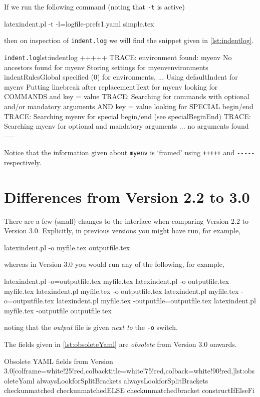 	 If we run the following command (noting that \texttt{-t} is active) \begin{commandshell}
latexindent.pl -t -l=logfile-prefs1.yaml simple.tex 
 \end{commandshell} then on inspection of \texttt{indent.log} we will find the snippet given in \cref{lst:indentlog}.
	 \begin{cmhlistings}[style=tcblatex,morekeywords={TRACE}]{\texttt{indent.log}}{lst:indentlog}
       +++++
TRACE: environment found: myenv
       No ancestors found for myenv
       Storing settings for myenvenvironments
       indentRulesGlobal specified (0) for environments, ...
       Using defaultIndent for myenv
       Putting linebreak after replacementText for myenv
       looking for COMMANDS and key = {value}
TRACE: Searching for commands with optional and/or mandatory arguments AND key = {value}
       looking for SPECIAL begin/end
TRACE: Searching myenv for special begin/end (see specialBeginEnd)
TRACE: Searching myenv for optional and mandatory arguments
       ... no arguments found
       -----
     \end{cmhlistings}
	 Notice that the information given about \texttt{myenv} is `framed' using \texttt{+++++} and \lstinline!-----! respectively.

	\section{Differences from Version 2.2 to 3.0}
	 \label{app:differences}
	 There are a few (small) changes to the interface when comparing Version 2.2 to Version 3.0.
	 Explicitly, in previous versions you might have run, for example, \begin{commandshell}
latexindent.pl -o myfile.tex outputfile.tex
 \end{commandshell} whereas in Version 3.0 you would run any of the following, for example, \begin{commandshell}
latexindent.pl -o=outputfile.tex myfile.tex
latexindent.pl -o outputfile.tex myfile.tex
latexindent.pl myfile.tex -o outputfile.tex 
latexindent.pl myfile.tex -o=outputfile.tex 
latexindent.pl myfile.tex -outputfile=outputfile.tex 
latexindent.pl myfile.tex -outputfile outputfile.tex 
 \end{commandshell} noting that the \emph{output} file is given \emph{next to} the \texttt{-o} switch.

	 The fields given in \cref{lst:obsoleteYaml} are \emph{obsolete} from Version 3.0 onwards.
	 \begin{yaml}[style=yaml-LST,numbers=none]{Obsolete YAML fields from Version 3.0}[colframe=white!25!red,colbacktitle=white!75!red,colback=white!90!red,]{lst:obsoleteYaml}
alwaysLookforSplitBrackets
alwaysLookforSplitBrackets
checkunmatched
checkunmatchedELSE
checkunmatchedbracket
constructIfElseFi
\end{yaml}

